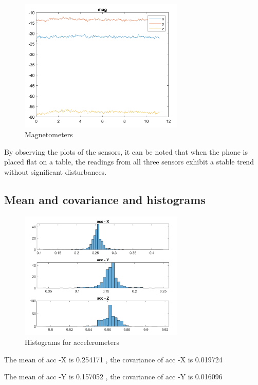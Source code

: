 \begin{figure}[H]
 \centering
 \includegraphics[width=0.7\textwidth]{images/magnetometers.png}
 \caption{Magnetometers}
 \label{mag}
\end{figure}

By observing the plots of the sensors, it can be noted that when the phone is placed flat on a table, the readings from all three sensors exhibit a stable trend without significant disturbances.

\subsection{Mean and covariance and histograms}

\begin{figure}[H]
 \centering
 \includegraphics[width=0.7\textwidth]{images/histogramacc.png}
 \caption{Histograms for accelerometers}
 \label{hisacc}
\end{figure}

The mean of acc -X is 0.254171 , the covariance of acc -X is 0.019724  

The mean of acc -Y is 0.157052 , the covariance of acc -Y is 0.016096 

